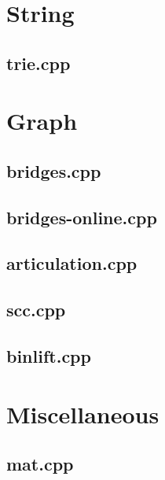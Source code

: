 \documentclass[a4paper, twocolumn]{article}
\begin{document}
\section{String}
\subsection{trie.cpp}



\section{Graph}
\subsection{bridges.cpp}

\subsection{bridges-online.cpp}

\subsection{articulation.cpp}

\subsection{scc.cpp}

\subsection{binlift.cpp}



\section{Miscellaneous}
\subsection{mat.cpp}

\end{document}
